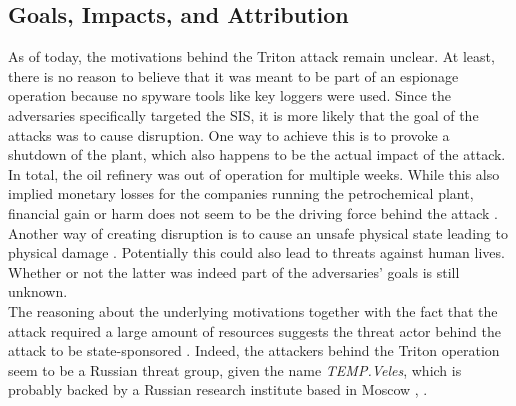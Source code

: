 \documentclass[runningheads]{llncs}
\begin{document}
\subsection{Goals, Impacts, and Attribution}
\label{subsection:triton-goals-impact-attribution}
As of today, the motivations behind the Triton attack remain unclear.
At least, there is no reason to believe that it was meant to be part of an espionage operation because no spyware tools like key loggers were used. %
Since the adversaries specifically targeted the SIS, it is more likely that the goal of the attacks was to cause disruption.
One way to achieve this is to provoke a shutdown of the plant, which also happens to be the actual impact of the attack.
In total, the oil refinery was out of operation for multiple weeks. %
While this also implied monetary losses for the companies running the petrochemical plant, financial gain or harm does not seem to be the driving force behind the attack \cite{kovacs.17}.
Another way of creating disruption is to cause an unsafe physical state leading to physical damage \cite{dragos.17}.
Potentially this could also lead to threats against human lives.
Whether or not the latter was indeed part of the adversaries' goals is still unknown.\\
The reasoning about the underlying motivations together with the fact that the attack required a large amount of resources suggests the threat actor behind the attack to be state-sponsored \cite{kovacs.17}.
Indeed, the attackers behind the Triton operation seem to be a Russian threat group, given the name \textit{TEMP.Veles}, which is probably backed by a Russian research institute based in Moscow \cite{fireeye.18}, \cite{sobczak.19}.
\end{document}
